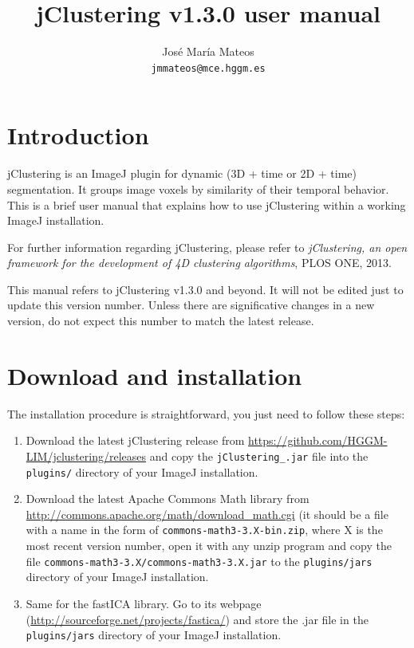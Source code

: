 \documentclass[11pt]{article} %
\title{jClustering v1.3.0 user manual}
\author{José María Mateos \\ \texttt{jmmateos@mce.hggm.es}}
\begin{document}
\maketitle

\tableofcontents

\section{Introduction}

jClustering is an ImageJ plugin for dynamic (3D + time or 2D + time) segmentation. It groups
image voxels by similarity of their temporal behavior. This is a brief user manual that explains
how to use jClustering within a working ImageJ installation.

For further information regarding jClustering, please refer to 
\emph{jClustering, an open framework for the development of 4D clustering algorithms}, PLOS ONE, 2013.

This manual refers to jClustering v1.3.0 and beyond. It will not be edited just to update this version number. Unless
there are significative changes in a new version, do not expect this number to match the latest release.

\section{Download and installation}

The installation procedure is straightforward, you just need to follow these steps:

\begin{enumerate}
\item Download the latest jClustering release from \url{https://github.com/HGGM-LIM/jclustering/releases} and copy the 
\texttt{jClustering\_.jar} file into the \texttt{plugins/} directory of your ImageJ installation.

\item Download the latest Apache Commons Math library from \url{http://commons.apache.org/math/download_math.cgi}
(it should be a file with a name in the form of \texttt{commons-math3-3.X-bin.zip}, where X is the most recent version number,
open it with any unzip program and copy the file \texttt{commons-math3-3.X/commons-math3-3.X.jar} to the 
\texttt{plugins/jars} directory of your ImageJ installation.

\item Same for the fastICA library. Go to its webpage (\url{http://sourceforge.net/projects/fastica/}) and store the .jar file
in the \texttt{plugins/jars} directory of your ImageJ installation.
\end{enumerate}
\end{document}
